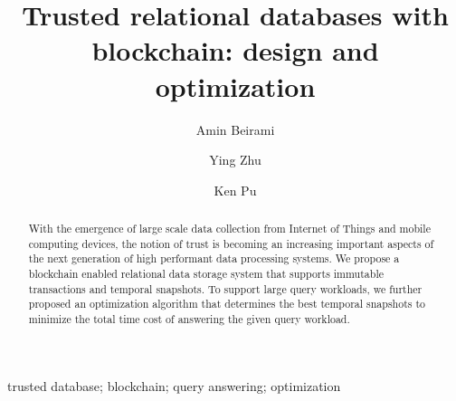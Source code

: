 \title{Trusted relational databases with blockchain: design and optimization}


\author[a]{Amin Beirami}
\author[b]{Ying Zhu}
\author[a]{Ken Pu}

\address[a]{Faculty of Science, UOIT, Oshawa, ON, Canada}
\address[b]{Faculty of Business and IT, UOIT, Oshawa, ON, Canada}

\begin{abstract}
    With the emergence of large scale data collection from Internet of Things
    and mobile computing devices, the notion of trust is becoming an increasing
    important aspects of the next generation of high performant data processing
    systems. We propose a blockchain enabled relational data storage system that
    supports immutable transactions and temporal snapshots.  
    To support large query workloads, we further proposed an optimization
    algorithm that determines the best temporal snapshots to minimize the total
    time cost of answering the given query workload.
\end{abstract}

\begin{keyword}
    trusted database; blockchain; query answering; optimization
\end{keyword}

